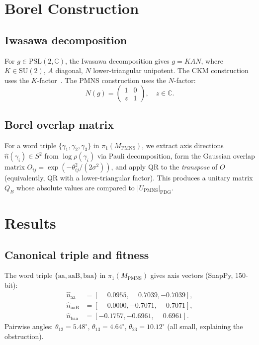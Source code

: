 \documentclass[11pt,a4paper]{article}
\theoremstyle{definition}
\newcommand{\MPMNS}{M_{\mathrm{PMNS}}}
\newcommand{\PSL}{\mathrm{PSL}(2,\mathbb{C})}
\begin{document}
\section{Borel Construction}
\label{sec:borel}

\subsection{Iwasawa decomposition}

For $g\in\PSL$, the Iwasawa decomposition gives $g=KAN$, where
$K\in\mathrm{SU}(2)$, $A$ diagonal, $N$ lower-triangular unipotent.
The CKM construction uses the $K$-factor~\cite{Gentry:CKM}.
The PMNS construction uses the $N$-factor:
\[
  N(g) = \begin{pmatrix} 1 & 0 \\ z & 1 \end{pmatrix},
  \quad z\in\mathbb{C}.
\]

\subsection{Borel overlap matrix}

For a word triple $\{\gamma_1,\gamma_2,\gamma_3\}$ in
$\pi_1(\MPMNS)$, we extract axis directions $\hat{n}(\gamma_i)\in S^2$
from $\log\rho(\gamma_i)$ via Pauli decomposition, form the Gaussian
overlap matrix $O_{ij}=\exp(-\theta_{ij}^2/(2\sigma^2))$, and apply
QR to the \emph{transpose} of $O$ (equivalently, QR with a
lower-triangular factor). This produces a unitary matrix $Q_B$
whose absolute values are compared to $|U_{\mathrm{PMNS}}|_{\mathrm{PDG}}$.

\section{Results}
\label{sec:results}

\subsection{Canonical triple and fitness}

The word triple $\{\mathrm{aa},\mathrm{aaB},\mathrm{baa}\}$
in $\pi_1(\MPMNS)$ gives axis vectors (SnapPy, 150-bit):
\begin{align*}
  \hat{n}_{\mathrm{aa}}  &= [\phantom{-}0.0955,\phantom{-}0.7039,-0.7039],\\
  \hat{n}_{\mathrm{aaB}} &= [\phantom{-}0.0000,-0.7071,\phantom{-}0.7071],\\
  \hat{n}_{\mathrm{baa}} &= [-0.1757,-0.6961,\phantom{-}0.6961].
\end{align*}
Pairwise angles: $\theta_{12}=5.48^\circ$, $\theta_{13}=4.64^\circ$,
$\theta_{23}=10.12^\circ$ (all small, explaining the obstruction).
\end{document}
